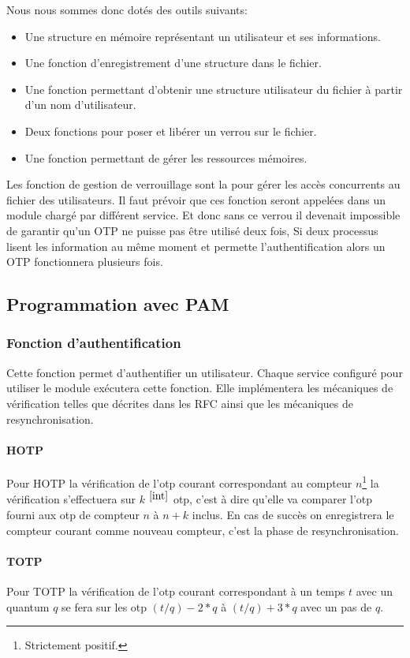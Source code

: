 Nous nous sommes donc dotés des outils suivants:
\begin{itemize}
  \item Une structure en mémoire représentant un utilisateur et ses 
  informations.
  \item Une fonction d'enregistrement d'une structure dans le fichier.
  \item Une fonction permettant d'obtenir une structure utilisateur du fichier 
  à partir d'un nom d'utilisateur.
  \item Deux fonctions pour poser et libérer un verrou sur le fichier.
  \item Une fonction permettant de gérer les ressources mémoires.\\
\end{itemize}

Les fonction de gestion de verrouillage sont la pour gérer les accès concurrents 
au fichier des utilisateurs. Il faut prévoir que ces fonction seront appelées 
dans un module chargé par différent service. Et donc sans ce verrou il devenait 
impossible de garantir qu'un OTP ne puisse pas être utilisé deux fois, Si deux 
processus lisent les information au même moment et permette l'authentification 
alors un OTP fonctionnera plusieurs fois.

\subsection{Programmation avec PAM}
\subsubsection{Fonction d'authentification}
Cette fonction permet d'authentifier un utilisateur. Chaque service configuré
pour utiliser le module exécutera cette fonction. Elle implémentera les 
mécaniques de vérification telles que décrites dans les RFC ainsi que les 
mécaniques de resynchronisation.
\paragraph{HOTP}
Pour HOTP la vérification de l'otp courant correspondant au compteur 
$n$\footnote{Strictement positif.\label{int}} la vérification s'effectuera sur 
$k$ $^{\ref{int}}$ otp, c'est à dire qu'elle va comparer l'otp fourni aux otp de 
compteur $n$ à $n+k$ inclus. En cas de succès on enregistrera le compteur 
courant comme nouveau compteur, c'est la phase de resynchronisation.
\paragraph{TOTP}
Pour TOTP la vérification de l'otp courant correspondant à un temps $t$ avec un 
quantum $q$ se fera sur les otp $(t / q) - 2 * q$ à $(t / q) + 3 *q$ avec un 
pas de $q$.
